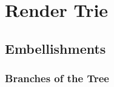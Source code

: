 \chapter{Render Trie}
\label{chap:render-trie}

\section{Embellishments}
\subsection{Branches of the Tree}


